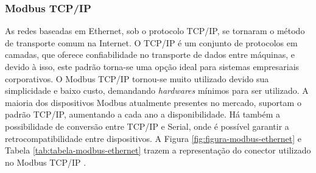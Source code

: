         \begin{figure}[!h]
	    \end{figure}
	    
	   \begin{table}[h!]	
        	\centering
        \end{table}
        
    \subsubsection{Modbus TCP/IP}
    \label{sec:modbus-tcp}

        As redes baseadas em Ethernet, sob o protocolo \gls{TCP/IP}, se tornaram o método de transporte comum na Internet. O \gls{TCP/IP} é um conjunto de protocolos em camadas, que oferece confiabilidade no transporte de dados entre máquinas, e devido à isso, este padrão torna-se uma opção ideal para sistemas empresariais corporativos. O Modbus \gls{TCP/IP} tornou-se muito utilizado devido sua simplicidade e baixo custo, demandando \textit{hardwares} mínimos para ser utilizado. A maioria dos dispositivos Modbus atualmente presentes no mercado, suportam o padrão \gls{TCP/IP}, aumentando a cada ano a disponibilidade. Há também a possibilidade de conversão entre TCP/IP e Serial, onde é possível garantir a retrocompatibilidade entre dispositivos. A Figura \ref{fig:figura-modbus-ethernet} e Tabela \ref{tab:tabela-modbus-ethernet} trazem a representação do conector utilizado no Modbus \gls{TCP/IP} \cite{Modbus}.

